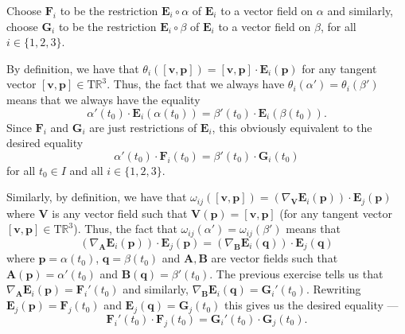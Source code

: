 \documentclass[12 pt, letterpaper]{hmcpset}
\begin{document}
\begin{solution}
	Choose $\mathbf{F}_{i}$ to be the restriction $\mathbf{E}_{i} \circ \alpha$ of $\mathbf{E}_{i}$ to a vector field on $\alpha$ and similarly, choose $\mathbf{G}_{i}$ to be the restriction $\mathbf{E}_{i} \circ \beta$ of $\mathbf{E}_{i}$ to a vector field on $\beta$, for all $i \in \{ 1, 2, 3 \}$. 

	By definition, we have that $\theta_{i}([\mathbf{v}, \mathbf{p}]) = [\mathbf{v}, \mathbf{p}] \cdot \mathbf{E}_{i}(\mathbf{p})$ for any tangent vector $[\mathbf{v}, \mathbf{p}] \in \mathrm{T}\mathbb{R}^{3}$. Thus, the fact that we always have $\theta_{i}(\alpha') = \theta_{i}(\beta')$ means that we always have the equality
	\[
		\alpha'(t_{0}) \cdot \mathbf{E}_{i}(\alpha(t_{0})) = \beta'(t_{0}) \cdot \mathbf{E}_{i}(\beta(t_{0})).
	\]
	Since $\mathbf{F}_{i}$ and $\mathbf{G}_{i}$ are just restrictions of $\mathbf{E}_{i}$, this obviously equivalent to the desired equality
	\[
		\alpha'(t_{0}) \cdot \mathbf{F}_{i}(t_{0}) = \beta'(t_{0}) \cdot \mathbf{G}_{i}(t_{0})
	\]
	for all $t_{0} \in I$ and all $i \in \{ 1, 2, 3 \}$. 

	Similarly, by definition, we have that $\omega_{ij}([\mathbf{v}, \mathbf{p}]) = (\nabla_{\mathbf{V}} \mathbf{E}_{i}(\mathbf{p})) \cdot \mathbf{E}_{j}(\mathbf{p})$ where $\mathbf{V}$ is any vector field such that $\mathbf{V}(\mathbf{p}) = [\mathbf{v}, \mathbf{p}]$ (for any tangent vector $[\mathbf{v}, \mathbf{p}] \in \mathrm{T}\mathbb{R}^{3}$). Thus, the fact that $\omega_{ij}(\alpha') = \omega_{ij}(\beta')$ means that
	\[
		(\nabla_{\mathbf{A}} \mathbf{E}_{i}(\mathbf{p})) \cdot \mathbf{E}_{j}(\mathbf{p}) = (\nabla_{\mathbf{B}} \mathbf{E}_{i}(\mathbf{q})) \cdot \mathbf{E}_{j}(\mathbf{q})
	\]
	where $\mathbf{p} = \alpha(t_{0})$, $\mathbf{q} = \beta(t_{0})$ and $\mathbf{A}, \mathbf{B}$ are vector fields such that $\mathbf{A}(\mathbf{p}) = \alpha'(t_{0})$ and $\mathbf{B}(\mathbf{q}) = \beta'(t_{0})$. The previous exercise tells us that $\nabla_{\mathbf{A}} \mathbf{E}_{i}(\mathbf{p}) = \mathbf{F}_{i}'(t_{0})$ and similarly, $\nabla_{\mathbf{B}} \mathbf{E}_{i}(\mathbf{q}) = \mathbf{G}_{i}'(t_{0})$. Rewriting $\mathbf{E}_{j}(\mathbf{p}) = \mathbf{F}_{j}(t_{0})$ and $\mathbf{E}_{j}(\mathbf{q}) = \mathbf{G}_{j}(t_{0})$ this gives us the desired equality ---
	\[
		\mathbf{F}_{i}'(t_{0}) \cdot \mathbf{F}_{j}(t_{0}) = \mathbf{G}_{i}'(t_{0}) \cdot \mathbf{G}_{j}(t_{0}).
	\]
\end{solution}

\pagebreak
\end{document}
